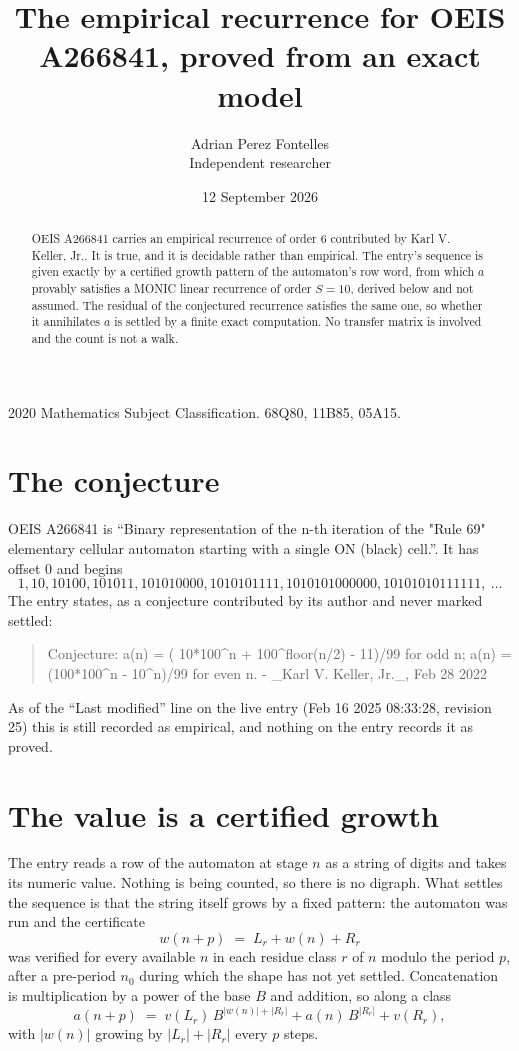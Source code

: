 \documentclass[11pt,a4paper]{article}
\title{The empirical recurrence for OEIS A266841, proved from an exact model}
\author{Adrian Perez Fontelles\\ \small Independent researcher}
\date{12 September 2026}
\theoremstyle{plain}
\theoremstyle{definition}
\begin{document}
\maketitle

\begin{abstract}
OEIS A266841 carries an empirical recurrence of order $6$ contributed by Karl V. Keller, Jr.. It is true, and it is
decidable rather than empirical. The entry's sequence is given exactly by a certified growth pattern of the automaton's row word, from
which $a$ provably satisfies a MONIC linear recurrence of order $S=10$, derived below and not
assumed. The residual of the conjectured recurrence satisfies the same one, so whether it
annihilates $a$ is settled by a finite exact computation. No transfer matrix is involved and
the count is not a walk.
\end{abstract}

\noindent\small 2020 Mathematics Subject Classification. 68Q80, 11B85, 05A15.\normalsize

\section{The conjecture}

OEIS A266841 is ``Binary representation of the n-th iteration of the "Rule 69" elementary cellular automaton starting with a single ON (black) cell.''. It has offset $0$ and begins
\[
1, 10, 10100, 101011, 101010000, 1010101111, 1010101000000, 10101010111111,\ \dots
\]
The entry states, as a conjecture contributed by its author and never marked settled:
\begin{quote}
Conjecture: a(n) = ( 10*100\^{}n + 100\^{}floor(n/2) - 11)/99 for odd n; a(n) = (100*100\^{}n - 10\^{}n)/99 for even n. - \_Karl V. Keller, Jr.\_, Feb 28 2022
\end{quote}
As of the ``Last modified'' line on the live entry (Feb 16 2025 08:33:28, revision 25)
this is still recorded as empirical, and nothing on the entry records it as proved.

\section{The value is a certified growth}

The entry reads a row of the automaton at stage $n$ as a string of digits and takes its
numeric value. Nothing is being counted, so there is no digraph. What settles the sequence is
that the string itself grows by a fixed pattern: the automaton was run and the certificate
\[
w(n+p)\;=\;L_r + w(n) + R_r
\]
was verified for every available $n$ in each residue class $r$ of $n$ modulo the period $p$,
after a pre-period $n_0$ during which the shape has not yet settled. Concatenation is
multiplication by a power of the base $B$ and addition, so along a class
\[
a(n+p)\;=\;v(L_r)\,B^{|w(n)|+|R_r|} + a(n)\,B^{|R_r|} + v(R_r),
\]
with $|w(n)|$ growing by $|L_r|+|R_r|$ every $p$ steps.
\end{document}
